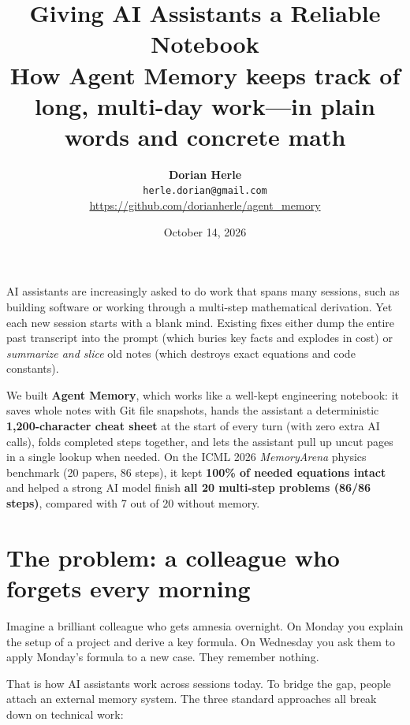\documentclass[11pt,a4paper]{article}
\title{\textbf{Giving AI Assistants a Reliable Notebook}\\[4pt]\large How Agent Memory keeps track of long, multi-day work---in plain words and concrete math}
\author{\textbf{Dorian Herle}\\\texttt{herle.dorian@gmail.com}\\\small\url{https://github.com/dorianherle/agent_memory}}
\date{October 14, 2026}
\begin{document}
\maketitle

\begin{callout}
AI assistants are increasingly asked to do work that spans many sessions, such as building software or working through a multi-step mathematical derivation. Yet each new session starts with a blank mind. Existing fixes either dump the entire past transcript into the prompt (which buries key facts and explodes in cost) or \emph{summarize and slice} old notes (which destroys exact equations and code constants).

We built \textbf{Agent Memory}, which works like a well-kept engineering notebook: it saves whole notes with Git file snapshots, hands the assistant a deterministic \textbf{1{,}200-character cheat sheet} at the start of every turn (with zero extra AI calls), folds completed steps together, and lets the assistant pull up uncut pages in a single lookup when needed. On the ICML 2026 \emph{MemoryArena} physics benchmark (20 papers, 86 steps), it kept \textbf{100\% of needed equations intact} and helped a strong AI model finish \textbf{all 20 multi-step problems (86/86 steps)}, compared with 7 out of 20 without memory.
\end{callout}

\section{The problem: a colleague who forgets every morning}

Imagine a brilliant colleague who gets amnesia overnight. On Monday you explain the setup of a project and derive a key formula. On Wednesday you ask them to apply Monday's formula to a new case. They remember nothing.

That is how AI assistants work across sessions today. To bridge the gap, people attach an external memory system. The three standard approaches all break down on technical work:
\end{document}
